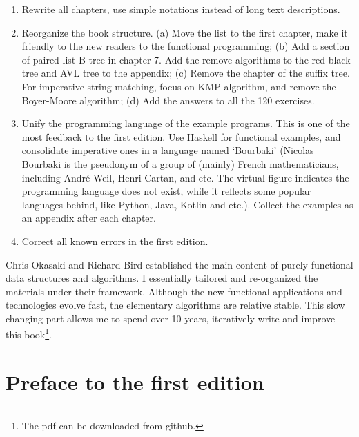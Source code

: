\documentclass[b5paper]{article}
\begin{document}
\begin{enumerate}
\item Rewrite all chapters, use simple notations instead of long text descriptions.

\item Reorganize the book structure. (a) Move the list to the first chapter, make it friendly to the new readers to the functional programming; (b) Add a section of paired-list B-tree in chapter 7. Add the remove algorithms to the red-black tree and AVL tree to the appendix; (c) Remove the chapter of the suffix tree. For imperative string matching, focus on KMP algorithm, and remove the Boyer-Moore algorithm; (d) Add the answers to all the 120 exercises.

\item Unify the programming language of the example programs. This is one of the most feedback to the first edition. Use Haskell for functional examples, and consolidate imperative ones in a language named `Bourbaki' (Nicolas Bourbaki is the pseudonym of a group of (mainly) French mathematicians, including André Weil, Henri Cartan, and etc. The virtual figure indicates the programming language does not exist, while it reflects some popular languages behind, like Python, Java, Kotlin and etc.). Collect the examples as an appendix after each chapter.

\item Correct all known errors in the first edition.
\end{enumerate}

Chris Okasaki and Richard Bird established the main content of purely functional data structures and algorithms. I essentially tailored and re-organized the materials under their framework. Although the new functional applications and technologies evolve fast, the elementary algorithms are relative stable. This slow changing part allows me to spend over 10 years, iteratively write and improve this book\footnote{The pdf can be downloaded from github.}.

\vspace{15mm}



\chapter*{Preface to the first edition}
\end{document}
